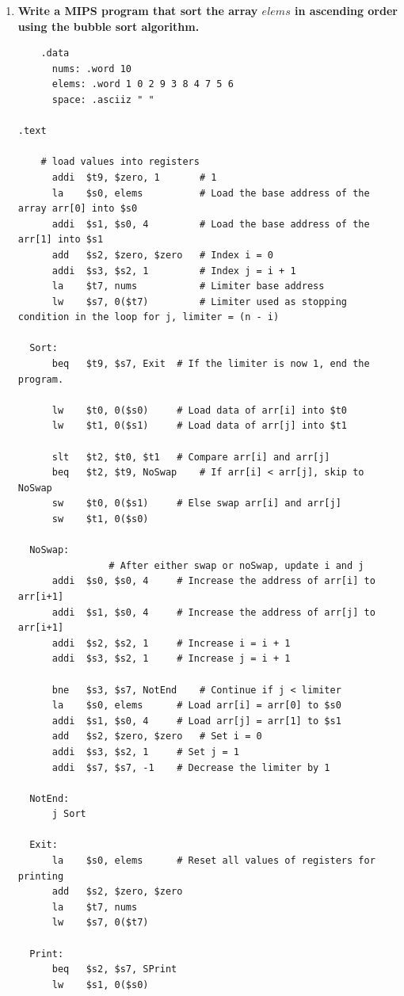 \documentclass[12pt,a4paper]{article}
\begin{document}
\begin{enumerate}
  \item \textbf{Write a MIPS program that sort the array \(elems\) in ascending order using the bubble sort algorithm.}
        \begin{mdframed}[hidealllines=true,backgroundcolor=magenta!10]
          \begin{lstlisting}
    .data
      nums: .word 10
      elems: .word 1 0 2 9 3 8 4 7 5 6
      space: .asciiz " "

.text

	# load values into registers
      addi  $t9, $zero, 1       # 1
      la    $s0, elems          # Load the base address of the array arr[0] into $s0
      addi  $s1, $s0, 4         # Load the base address of the arr[1] into $s1
      add   $s2, $zero, $zero   # Index i = 0
      addi  $s3, $s2, 1         # Index j = i + 1
      la    $t7, nums           # Limiter base address
      lw    $s7, 0($t7)         # Limiter used as stopping condition in the loop for j, limiter = (n - i)

  Sort:
      beq   $t9, $s7, Exit	# If the limiter is now 1, end the program.

      lw    $t0, 0($s0)		# Load data of arr[i] into $t0
      lw    $t1, 0($s1)		# Load data of arr[j] into $t1

      slt   $t2, $t0, $t1	# Compare arr[i] and arr[j]
      beq   $t2, $t9, NoSwap	# If arr[i] < arr[j], skip to NoSwap
      sw    $t0, 0($s1)		# Else swap arr[i] and arr[j]
      sw    $t1, 0($s0)

  NoSwap:
  				# After either swap or noSwap, update i and j
      addi  $s0, $s0, 4		# Increase the address of arr[i] to arr[i+1]
      addi  $s1, $s0, 4		# Increase the address of arr[j] to arr[i+1]
      addi  $s2, $s2, 1		# Increase i = i + 1
      addi  $s3, $s2, 1		# Increase j = i + 1

      bne   $s3, $s7, NotEnd	# Continue if j < limiter
      la    $s0, elems		# Load arr[i] = arr[0] to $s0
      addi  $s1, $s0, 4		# Load arr[j] = arr[1] to $s1
      add   $s2, $zero, $zero	# Set i = 0
      addi  $s3, $s2, 1		# Set j = 1
      addi  $s7, $s7, -1	# Decrease the limiter by 1

  NotEnd:
      j Sort

  Exit:
      la    $s0, elems		# Reset all values of registers for printing
      add   $s2, $zero, $zero
      la    $t7, nums
      lw    $s7, 0($t7)

  Print:
      beq   $s2, $s7, SPrint
      lw    $s1, 0($s0)


\end{lstlisting}
\end{mdframed}
\end{enumerate}
\end{document}
